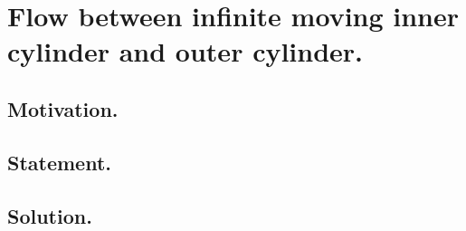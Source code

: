 
%

\chapter{Flow between infinite moving inner cylinder and outer cylinder.}
\label{chap:twoCylinders}
{}
\date{Apr 10, 2012}

\beginArtWithToc

\section{Motivation.}
\section{Statement.}
\section{Solution.}

\EndNoBibArticle
